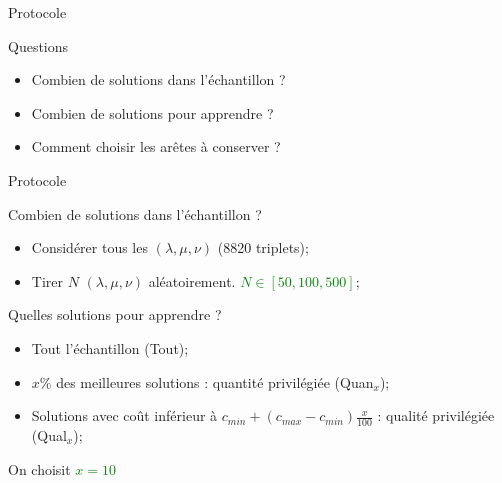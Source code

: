 \documentclass{beamer}
\begin{document}
\begin{frame}{Protocole}
\begin{alertblock}{Questions}
\begin{itemize}
\item Combien de solutions dans l'échantillon ?
\item Combien de solutions pour apprendre ?
\item Comment choisir les arêtes à conserver ?
\end{itemize}
\end{alertblock}
\end{frame}

\begin{frame}{Protocole}

\begin{block}{Combien de solutions dans l'échantillon ?}
\begin{itemize}
\item Considérer tous les $(\lambda,\mu,\nu)$ (8820 triplets);
\item Tirer $N$ $(\lambda,\mu,\nu)$ aléatoirement. \textcolor{green}{$N \in [50,100,500]$};
\end{itemize}
\end{block}

\begin{block}{Quelles solutions pour apprendre ?}
\begin{itemize}
\item Tout l'échantillon (Tout);
\item $x\%$ des meilleures solutions : quantité privilégiée (Quan$_{x}$);
\item Solutions avec coût inférieur à $c_{min} + (c_{max}-c_{min})\frac{x}{100}$ : qualité privilégiée (Qual$_{x}$);
\end{itemize}
On choisit \textcolor{green}{$x = 10$}
\end{block}
\end{frame}
\end{document}
